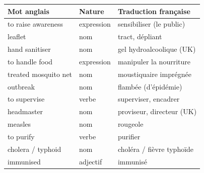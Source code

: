 \documentclass[11pt]{article}
\begin{document}
\begin{center}
\begin{tabularx}{\linewidth}{|l|l|X|}
\hline
\rowcolor{popblueL} Mot anglais & Nature & Traduction française \\
\hline
to raise awareness & expression & sensibiliser (le public) \\
\hline
leaflet & nom & tract, dépliant \\
\hline
hand sanitiser & nom & gel hydroalcoolique (UK) \\
\hline
to handle food & expression & manipuler la nourriture \\
\hline
treated mosquito net & nom & moustiquaire imprégnée \\
\hline
outbreak & nom & flambée (d'épidémie) \\
\hline
to supervise & verbe & superviser, encadrer \\
\hline
headmaster & nom & proviseur, directeur (UK) \\
\hline
measles & nom & rougeole \\
\hline
to purify & verbe & purifier \\
\hline
cholera / typhoid & nom & choléra / fièvre typhoïde \\
\hline
immunised & adjectif & immunisé \\
\hline
\end{tabularx}
\end{center}
\end{document}
